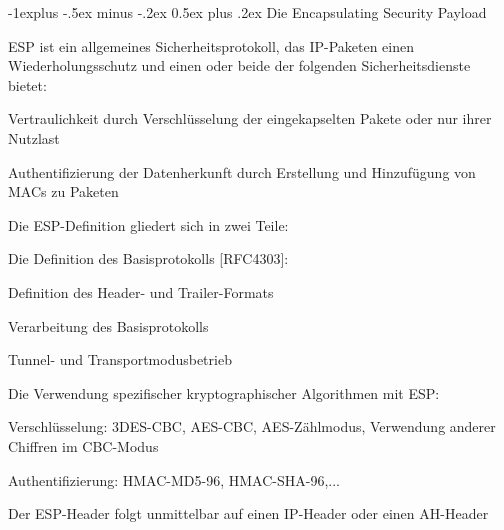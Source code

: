 \documentclass[a4paper]{article}
\makeatletter
\renewcommand{\subsection}{\@startsection{subsection}{2}{0mm}%
 {-1explus -.5ex minus -.2ex}%
 {0.5ex plus .2ex}%
 {\normalfont\normalsize\bfseries}}
\makeatother
\begin{document}
\begin{multicols}{3}
      \subsection{Die Encapsulating Security Payload}
      \begin{itemize*}
            \item ESP ist ein allgemeines Sicherheitsprotokoll, das IP-Paketen einen Wiederholungsschutz und einen oder beide der folgenden Sicherheitsdienste bietet:
            \begin{itemize*}
                  \item Vertraulichkeit durch Verschlüsselung der eingekapselten Pakete oder nur ihrer Nutzlast
                  \item Authentifizierung der Datenherkunft durch Erstellung und Hinzufügung von MACs zu Paketen
            \end{itemize*}
            \item Die ESP-Definition gliedert sich in zwei Teile:
            \begin{itemize*}
                  \item Die Definition des Basisprotokolls {[}RFC4303{]}:
                  \begin{itemize*}
                        \item Definition des Header- und Trailer-Formats
                        \item Verarbeitung des Basisprotokolls
                        \item Tunnel- und Transportmodusbetrieb
                  \end{itemize*}
                  \item Die Verwendung spezifischer kryptographischer Algorithmen mit ESP:
                  \begin{itemize*}
                        \item Verschlüsselung: 3DES-CBC, AES-CBC, AES-Zählmodus, Verwendung anderer Chiffren im CBC-Modus
                        \item Authentifizierung: HMAC-MD5-96, HMAC-SHA-96,...
                  \end{itemize*}
            \end{itemize*}
            \begin{itemize*}
                  \item Der ESP-Header folgt unmittelbar auf einen IP-Header oder einen AH-Header

\end{itemize*}
\end{itemize*}
\end{multicols}
\end{document}
